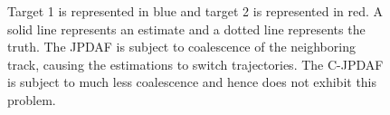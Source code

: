 \documentclass[letterpaper, 10pt, conference]{ieeeconf}
\begin{document}
\begin{figure}
\centerline{
	}
\centerline{
	}
\centerline{
	}
\caption{Target 1 is represented in blue and target 2 is represented in red. A solid line represents an estimate and a dotted line represents the truth. The JPDAF is subject to coalescence of the neighboring track, causing the estimations to switch trajectories. The C-JPDAF is subject to much less coalescence and hence does not exhibit this problem.}
\label{AllAlgorithms}
\end{figure}
\end{document}
